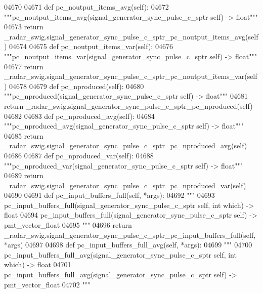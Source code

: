 \begin{DoxyCode}
{{{{{{{{{{{{{{{{04670 
04671     \textcolor{keyword}{def }pc_noutput_items_avg(self):
04672         \textcolor{stringliteral}{"""pc\_noutput\_items\_avg(signal\_generator\_sync\_pulse\_c\_sptr self) -> float"""}
04673         \textcolor{keywordflow}{return} \_radar\_swig.signal\_generator\_sync\_pulse\_c\_sptr\_pc\_noutput\_items\_avg(self)
04674 
04675     \textcolor{keyword}{def }pc_noutput_items_var(self):
04676         \textcolor{stringliteral}{"""pc\_noutput\_items\_var(signal\_generator\_sync\_pulse\_c\_sptr self) -> float"""}
04677         \textcolor{keywordflow}{return} \_radar\_swig.signal\_generator\_sync\_pulse\_c\_sptr\_pc\_noutput\_items\_var(self)
04678 
04679     \textcolor{keyword}{def }pc_nproduced(self):
04680         \textcolor{stringliteral}{"""pc\_nproduced(signal\_generator\_sync\_pulse\_c\_sptr self) -> float"""}
04681         \textcolor{keywordflow}{return} \_radar\_swig.signal\_generator\_sync\_pulse\_c\_sptr\_pc\_nproduced(self)
04682 
04683     \textcolor{keyword}{def }pc_nproduced_avg(self):
04684         \textcolor{stringliteral}{"""pc\_nproduced\_avg(signal\_generator\_sync\_pulse\_c\_sptr self) -> float"""}
04685         \textcolor{keywordflow}{return} \_radar\_swig.signal\_generator\_sync\_pulse\_c\_sptr\_pc\_nproduced\_avg(self)
04686 
04687     \textcolor{keyword}{def }pc_nproduced_var(self):
04688         \textcolor{stringliteral}{"""pc\_nproduced\_var(signal\_generator\_sync\_pulse\_c\_sptr self) -> float"""}
04689         \textcolor{keywordflow}{return} \_radar\_swig.signal\_generator\_sync\_pulse\_c\_sptr\_pc\_nproduced\_var(self)
04690 
04691     \textcolor{keyword}{def }pc_input_buffers_full(self, *args):
04692         \textcolor{stringliteral}{"""}
04693 \textcolor{stringliteral}{        pc\_input\_buffers\_full(signal\_generator\_sync\_pulse\_c\_sptr self, int which) -> float}
04694 \textcolor{stringliteral}{        pc\_input\_buffers\_full(signal\_generator\_sync\_pulse\_c\_sptr self) -> pmt\_vector\_float}
04695 \textcolor{stringliteral}{        """}
04696         \textcolor{keywordflow}{return} \_radar\_swig.signal\_generator\_sync\_pulse\_c\_sptr\_pc\_input\_buffers\_full(self, *args)
04697 
04698     \textcolor{keyword}{def }pc_input_buffers_full_avg(self, *args):
04699         \textcolor{stringliteral}{"""}
04700 \textcolor{stringliteral}{        pc\_input\_buffers\_full\_avg(signal\_generator\_sync\_pulse\_c\_sptr self, int which) -> float}
04701 \textcolor{stringliteral}{        pc\_input\_buffers\_full\_avg(signal\_generator\_sync\_pulse\_c\_sptr self) -> pmt\_vector\_float}
04702 \textcolor{stringliteral}{        """}
}}}}}}}}}}}}}}}}
\end{DoxyCode}
